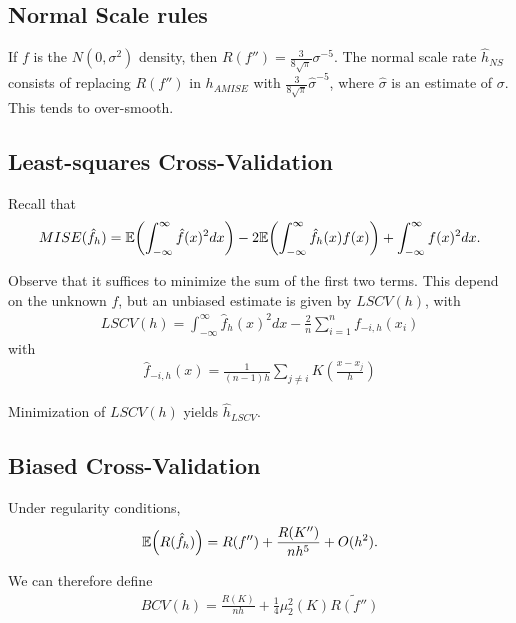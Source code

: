 \subsection{Normal Scale rules}
\label{sec:normal-scale-rules-1}

If $f$ is the $N(0, \sigma^{2})$ density, then $R(f'') = \frac{3}{8
  \sqrt{\pi}} \sigma^{-5}$.    The normal scale rate $\hat h_{NS}$
consists of replacing $R(f'')$ in $h_{AMISE}$ with $\frac{3}{8
  \sqrt{\pi}} \hat \sigma^{-5}$, where $\hat \sigma$ is an estimate of
$\sigma$.  This tends to over-smooth.

\subsection{Least-squares Cross-Validation}
\label{sec:least-squares-cross}

Recall that
\begin{equation}
  \label{eq:30}
  MISE(\hat f_{h}) = \E{\int_{-\infty}^{\infty} \hat f(x)^{2} dx} - 2
  \E{\int_{-\infty}^{\infty} \hat f_{h}(x) f(x)} +
  \int_{-\infty}^{\infty} f(x)^{2} dx.
\end{equation}

Observe that it suffices to minimize the sum of the first two terms.
This depend on the unknown $f$, but an unbiased estimate is given by
$LSCV(h)$, with
\begin{align}
  \label{eq:31}
  LSCV(h) = \int_{-\infty}^{\infty} \hat f_{h}(x)^{2} dx - \frac{2}{n}
  \sum_{i=1}^{n} f_{-i, h}(x_{i})
\end{align} with
\begin{align}
  \label{eq:32}
  \hat f_{-i, h}(x) = \frac{1}{(n-1)h} \sum_{j \neq i} K(\frac{x - x_{j}}{h})
\end{align}

Minimization of $LSCV(h)$ yields $\hat h_{LSCV}$.

\subsection{Biased Cross-Validation}
\label{sec:bias-cross-valid}

Under regularity conditions,
\begin{align}
  \label{eq:34}
  \E{R(\hat f_{h})} = R(f'') + \frac{R(K'')}{n h^{5}} + O(h^{2}).
\end{align}

We can therefore define
\begin{align}
  \label{eq:36}
  BCV(h) = \frac{R(K)}{nh} + \frac{1}{4} \mu_{2}^{2}(K) \widetilde{R(f'')}
\end{align}


